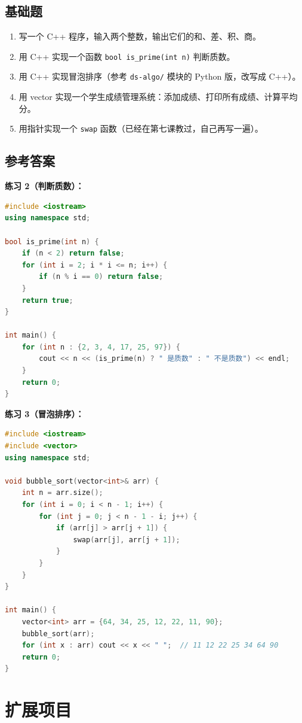 \documentclass[a4paper,12pt]{ctexart}
\begin{document}
\subsection*{基础题}

\begin{enumerate}
  \item 写一个 C++ 程序，输入两个整数，输出它们的和、差、积、商。
  \item 用 C++ 实现一个函数 \texttt{bool is\_prime(int n)} 判断质数。
  \item 用 C++ 实现冒泡排序（参考 \texttt{ds-algo/} 模块的 Python 版，改写成 C++）。
  \item 用 vector 实现一个学生成绩管理系统：添加成绩、打印所有成绩、计算平均分。
  \item 用指针实现一个 \texttt{swap} 函数（已经在第七课教过，自己再写一遍）。
\end{enumerate}

\subsection*{参考答案}

\textbf{练习 2（判断质数）：}
\begin{lstlisting}[language=C++]
#include <iostream>
using namespace std;

bool is_prime(int n) {
    if (n < 2) return false;
    for (int i = 2; i * i <= n; i++) {
        if (n % i == 0) return false;
    }
    return true;
}

int main() {
    for (int n : {2, 3, 4, 17, 25, 97}) {
        cout << n << (is_prime(n) ? " 是质数" : " 不是质数") << endl;
    }
    return 0;
}
\end{lstlisting}

\textbf{练习 3（冒泡排序）：}
\begin{lstlisting}[language=C++]
#include <iostream>
#include <vector>
using namespace std;

void bubble_sort(vector<int>& arr) {
    int n = arr.size();
    for (int i = 0; i < n - 1; i++) {
        for (int j = 0; j < n - 1 - i; j++) {
            if (arr[j] > arr[j + 1]) {
                swap(arr[j], arr[j + 1]);
            }
        }
    }
}

int main() {
    vector<int> arr = {64, 34, 25, 12, 22, 11, 90};
    bubble_sort(arr);
    for (int x : arr) cout << x << " ";  // 11 12 22 25 34 64 90
    return 0;
}
\end{lstlisting}

\section*{扩展项目}
\end{document}
